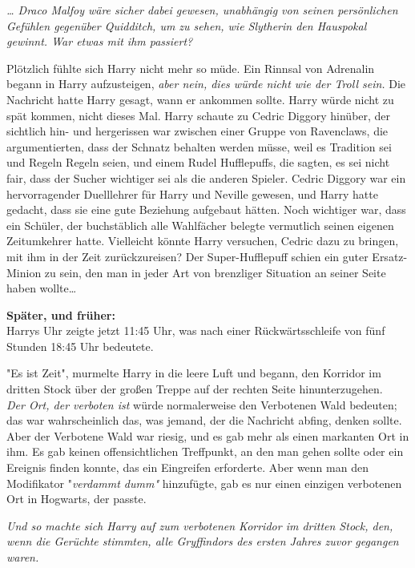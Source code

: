 {\emph{… Draco Malfoy wäre sicher dabei gewesen, unabhängig von seinen persönlichen Gefühlen gegenüber Quidditch, um zu sehen, wie Slytherin den Hauspokal gewinnt. War etwas mit ihm passiert?}

Plötzlich fühlte sich Harry nicht mehr so müde. Ein Rinnsal von Adrenalin begann in Harry aufzusteigen, \emph{aber nein, dies würde nicht wie der Troll sein.} Die Nachricht hatte Harry gesagt, wann er ankommen sollte. Harry würde nicht zu spät kommen, nicht dieses Mal. Harry schaute zu Cedric Diggory hinüber, der sichtlich hin- und hergerissen war zwischen einer Gruppe von Ravenclaws, die argumentierten, dass der Schnatz behalten werden müsse, weil es Tradition sei und Regeln Regeln seien, und einem Rudel Hufflepuffs, die sagten, es sei nicht fair, dass der Sucher wichtiger sei als die anderen Spieler. Cedric Diggory war ein hervorragender Duelllehrer für Harry und Neville gewesen, und Harry hatte gedacht, dass sie eine gute Beziehung aufgebaut hätten. Noch wichtiger war, dass ein Schüler, der buchstäblich alle Wahlfächer belegte vermutlich seinen eigenen Zeitumkehrer hatte. Vielleicht könnte Harry versuchen, Cedric dazu zu bringen, mit ihm in der Zeit zurückzureisen? Der Super-Hufflepuff schien ein guter Ersatz-Minion zu sein, den man in jeder Art von brenzliger Situation an seiner Seite haben wollte…

\textbf{Später, und früher:}\\ Harrys Uhr zeigte jetzt 11:45 Uhr, was nach einer Rückwärtsschleife von fünf Stunden 18:45 Uhr bedeutete.

"Es ist Zeit", murmelte Harry in die leere Luft und begann, den Korridor im dritten Stock über der großen Treppe auf der rechten Seite hinunterzugehen.\\ \emph{Der Ort, der verboten ist} würde normalerweise den Verbotenen Wald bedeuten; das war wahrscheinlich das, was jemand, der die Nachricht abfing, denken sollte.\\ Aber der Verbotene Wald war riesig, und es gab mehr als einen markanten Ort in ihm. Es gab keinen offensichtlichen Treffpunkt, an den man gehen sollte oder ein Ereignis finden konnte, das ein Eingreifen erforderte. Aber wenn man den Modifikator "\emph{verdammt dumm"} hinzufügte, gab es nur einen einzigen verbotenen Ort in Hogwarts, der passte.

\emph{Und so machte sich Harry auf zum verbotenen Korridor im dritten Stock, den, wenn die Gerüchte stimmten, alle Gryffindors des ersten Jahres zuvor gegangen waren.}

}
